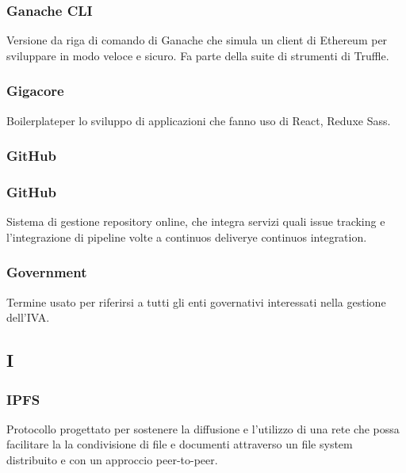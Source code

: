 \subsubsection*{Ganache CLI}
Versione da riga di comando di Ganache che simula un client di Ethereum per sviluppare in modo veloce e sicuro. Fa parte della suite di strumenti di Truffle\glo.


\subsubsection*{Gigacore}
Boilerplate\glosp per lo sviluppo di applicazioni che fanno uso di React\glo, Redux\glosp e Sass\glo.

\subsubsection*{GitHub}

\subsubsection*{GitHub}
Sistema di gestione repository online, che integra servizi quali issue tracking e l'integrazione di pipeline volte a continuos delivery\glosp e continuos integration\glo.



\subsubsection*{Government}
Termine usato per riferirsi a tutti gli enti governativi interessati nella gestione dell'IVA.


\subsection*{I}

\subsubsection*{IPFS}
Protocollo progettato per sostenere la diffusione e l'utilizzo di una rete che possa facilitare la la condivisione di file e documenti attraverso un file system distribuito e con un approccio peer-to-peer\glo.

